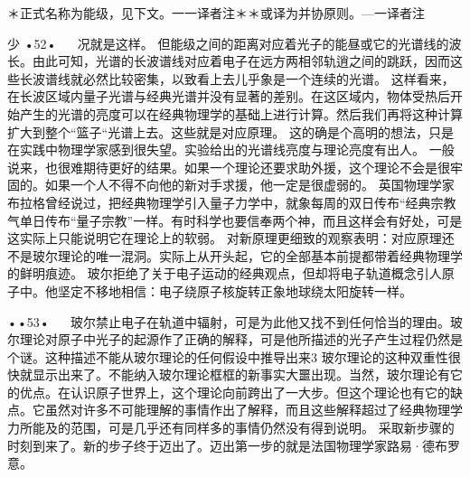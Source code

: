 ＊正式名称为能级，见下文。一一译者注＊＊或译为并协原则。—一译者注

少
•52•
  
况就是这样。
但能级之间的距离对应着光子的能昼或它的光谱线的波长。由此可知，光谱的长波谱线对应着电子在远方两相邻轨逍之间的跳跃，因而这些长波谱线就必然比较密集，以致看上去儿乎象是一个连续的光谱。
这样看来，在长波区域内量子光谱与经典光谱并没有显著的差别。在这区域内，物体受热后开始产生的光谱的亮度可以在经典物理学的基础上进行计算。然后我们再将这种计算扩大到整个“篮子“光谱上去。这些就是对应原理。
这的确是个高明的想法，只是在实践中物理学家感到很失望。实验给出的光谱线亮度与理论亮度有出人。
一般说来，也很难期待更好的结果。如果一个理论还要求助外援，这个理论不会是很牢固的。如果一个人不得不向他的新对手求援，他一定是很虚弱的。
英国物理学家布拉格曾经说过，把经典物理学引入量子力学中，就象每周的双日传布“经典宗教气单日传布“量子宗教”一样。有时科学也要信奉两个神，而且这样会有好处，可是这实际上只能说明它在理论上的软弱。
对新原理更细致的观察表明：对应原理还不是玻尔理论的唯一混洞。实际上从开头起，它的全部基本前提都带着经典物理学的鲜明痕迹。
玻尔拒绝了关于电子运动的经典观点，但却将电子轨道概念引人原子中。他坚定不移地相信：电子绕原子核旋转正象地球绕太阳旋转一样。

••53•
  
玻尔禁止电子在轨道中辐射，可是为此他又找不到任何恰当的理由。玻尔理论对原子中光子的起源作了正确的解释，可是他所描述的光子产生过程仍然是个谜。这种描述不能从玻尔理论的任何假设中推导出来3
玻尔理论的这种双重性很快就显示出来了。不能纳入玻尔理论框框的新事实大噩出现。当然，玻尔理论有它的优点。在认识原子世界上，这个理论向前跨出了一大步。但这个理论也有它的缺点。它虽然对许多不可能理解的事情作出了解释，而且这些解释超过了经典物理学力所能及的范围，可是几乎还有同样多的事情仍然没有得到说明。
采取新步骤的时刻到来了。新的步子终于迈出了。迈出第一步的就是法国物理学家路易·德布罗意。


